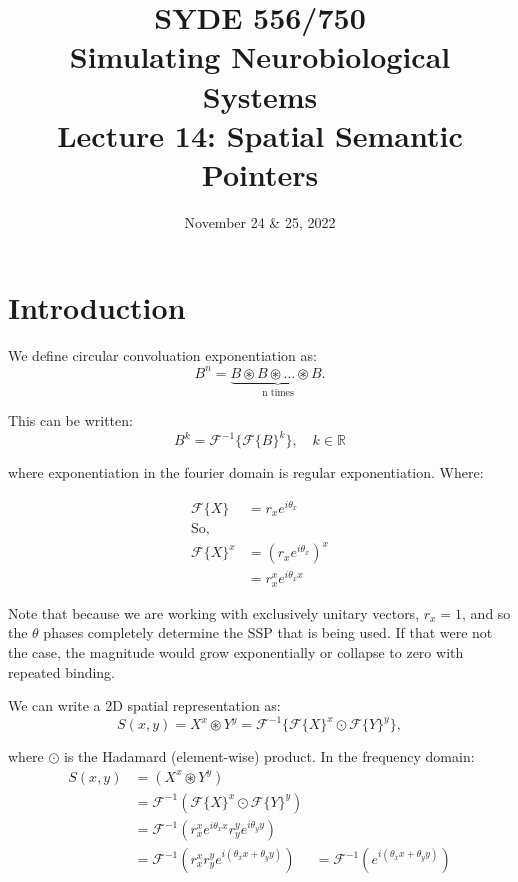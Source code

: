 \documentclass[10pt,letterpaper,oneside]{article}
\date{November 24 \& 25, 2022}
\title{SYDE 556/750 \\ Simulating Neurobiological Systems \\ Lecture 14: Spatial Semantic Pointers}
\begin{document}

\section{Introduction}


We define circular convoluation exponentiation as: 
\begin{equation}
  B^n = \underbrace{B \circledast B \circledast \dots \circledast B. }_{\text{n times}}
\end{equation}

This can be written: 
\begin{equation}
  B^k = \mathcal{F}^{-1}\{\mathcal{F}\{B\}^k\}, \quad k \in \mathbb{R}
\end{equation}

where exponentiation in the fourier domain is regular exponentiation.  Where: 

\begin{align}
  \mathcal{F}\{ X\} &= r_{x} e^{i \theta_{x}} \\
  \textrm{So,}\\
  \mathcal{F}\{ X\}^x &= \left( r_{x} e^{i \theta_{x}} \right)^x \\
  &= r_{x}^x e^{i \theta_{x} x} 
\end{align}

Note that because we are working with exclusively unitary vectors, $r_x = 1$, and so the $\theta$ phases completely determine the SSP that is being used. If that were not the case, the magnitude would grow exponentially or collapse to zero with repeated binding.

We can write a 2D spatial representation as: 
\begin{equation}
  S(x,y) = X^x \circledast Y^y = \mathcal{F}^{-1}\{\mathcal{F}\{X\}^x\odot\mathcal{F} \{Y\}^y\},
\end{equation}

where $\odot$ is the Hadamard (element-wise) product. In the frequency domain: 
\begin{align}
  S(x, y) &= (X^{x} \circledast Y^{y}) \\
   &= \mathcal{F}^{-1}( \mathcal{F}\{ X\}^{x} \odot \mathcal{F}\{ Y\}^{y} ) \\
   &=  \mathcal{F}^{-1}(r_{x}^x e^{ i \theta_{x} x} r_{y}^y  e^{i \theta_{y} y })\\
   &=  \mathcal{F}^{-1}(r_{x}^x r_{y}^y e^{ i(\theta_{x} x + \theta_{y} y )})
   &=  \mathcal{F}^{-1}(e^{ i(\theta_{x} x + \theta_{y} y )})
\end{align}
\end{document}
